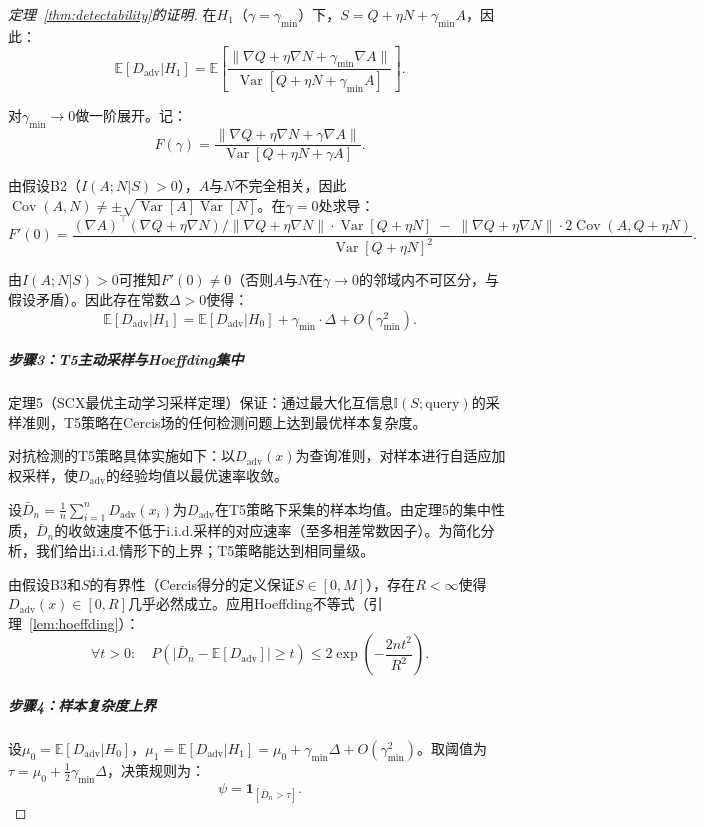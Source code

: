 \documentclass[12pt,a4paper]{article}
\newcommand{\E}{\mathbb{E}}
\newcommand{\I}{\mathbb{I}}
\newcommand{\ind}[1]{\mathbf{1}_{[#1]}}
\newcommand{\Var}{\operatorname{Var}}
\newcommand{\Cov}{\operatorname{Cov}}
\newcommand{\adv}{\mathrm{adv}}
\begin{document}
\begin{proof}[定理~\ref{thm:detectability}的证明]
在$H_1$（$\gamma = \gamma_{\min}$）下，$S = Q + \eta N + \gamma_{\min} A$，因此：
\[
\E[D_{\adv}|H_1] = \E\!\left[ \frac{\|\nabla Q + \eta \nabla N + \gamma_{\min} \nabla A\|}
                                   {\Var[Q + \eta N + \gamma_{\min} A]} \right].
\]

对$\gamma_{\min} \to 0$做一阶展开。记：
\[
F(\gamma) = \frac{\|\nabla Q + \eta \nabla N + \gamma \nabla A\|}
                 {\Var[Q + \eta N + \gamma A]}.
\]

由假设B2（$I(A;N|S)>0$），$A$与$N$不完全相关，因此$\Cov(A, N) \neq \pm \sqrt{\Var[A]\Var[N]}$。在$\gamma = 0$处求导：
\[
F'(0) = \frac{ (\nabla A)^\top (\nabla Q + \eta \nabla N) / \|\nabla Q + \eta \nabla N\|
          \cdot \Var[Q+\eta N] \;-\; \|\nabla Q + \eta \nabla N\| \cdot 2\Cov(A, Q+\eta N) }
          {\Var[Q+\eta N]^2}.
\]

由$I(A;N|S)>0$可推知$F'(0) \neq 0$（否则$A$与$N$在$\gamma \to 0$的邻域内不可区分，与假设矛盾）。因此存在常数$\Delta > 0$使得：
\begin{equation}\label{eq:Dadv-expansion}
\E[D_{\adv}|H_1] = \E[D_{\adv}|H_0] + \gamma_{\min} \cdot \Delta + O(\gamma_{\min}^2).
\end{equation}

\subparagraph{步骤3：T5主动采样与Hoeffding集中}
定理5（SCX最优主动学习采样定理）保证：通过最大化互信息$\I(S; \text{query})$的采样准则，T5策略在Cercis场的任何检测问题上达到最优样本复杂度。

对抗检测的T5策略具体实施如下：以$D_{\adv}(x)$为查询准则，对样本进行自适应加权采样，使$D_{\adv}$的经验均值以最优速率收敛。

设$\bar{D}_n = \frac1n \sum_{i=1}^n D_{\adv}(x_i)$为$D_{\adv}$在T5策略下采集的样本均值。由定理5的集中性质，$\bar{D}_n$的收敛速度不低于i.i.d.采样的对应速率（至多相差常数因子）。为简化分析，我们给出i.i.d.情形下的上界；T5策略能达到相同量级。

由假设B3和$S$的有界性（Cercis得分的定义保证$S \in [0, M]$），存在$R < \infty$使得$D_{\adv}(x) \in [0, R]$几乎必然成立。应用Hoeffding不等式（引理~\ref{lem:hoeffding}）：
\begin{equation}\label{eq:hoeffding-dadv}
\forall t > 0:\quad
P\!\left( \bigl| \bar{D}_n - \E[D_{\adv}] \bigr| \geq t \right) \leq 2\exp\!\left( -\frac{2n t^2}{R^2} \right).
\end{equation}

\subparagraph{步骤4：样本复杂度上界}
设$\mu_0 = \E[D_{\adv}|H_0]$，$\mu_1 = \E[D_{\adv}|H_1] = \mu_0 + \gamma_{\min} \Delta + O(\gamma_{\min}^2)$。取阈值为$\tau = \mu_0 + \frac12 \gamma_{\min} \Delta$，决策规则为：
\[
\psi = \ind{\bar{D}_n > \tau}.
\]


\end{proof}
\end{document}
